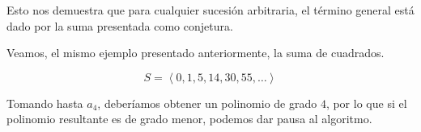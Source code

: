 Esto nos demuestra que para cualquier sucesión arbitraria, el término general está dado
por la suma presentada como conjetura.

\newpage

Veamos, el mismo ejemplo presentado anteriormente, la suma de cuadrados.

\[S = \left<0,1,5,14,30,55,\dots\right>\]

Tomando hasta $a_4$, deberíamos obtener un polinomio de grado $4$, por lo que
si el polinomio resultante es de grado menor, podemos dar pausa al algoritmo.


    \begin{longderivation}
            \\
        \\
            \\
        \why*{}\\
            \\
        \why*{}\\
    \end{longderivation}

